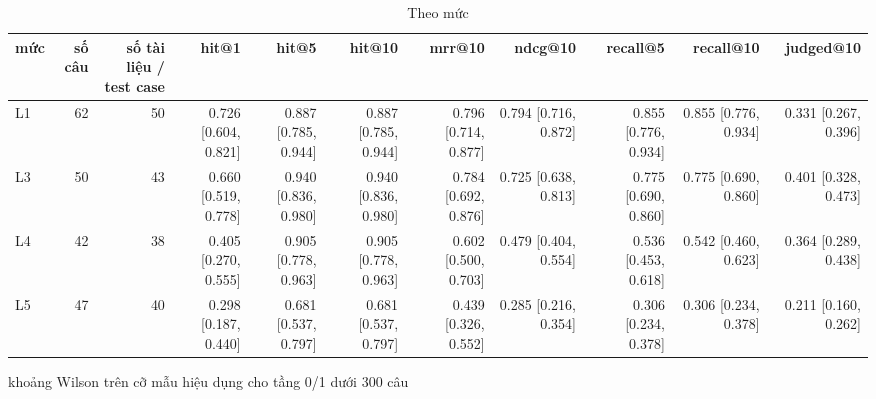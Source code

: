 \begin{table}[ht]
\centering
\caption{Theo mức}
\begin{tabular}{lrrrrrrrrrr}
\toprule
mức & số câu & số tài liệu / test case & hit@1 & hit@5 & hit@10 & mrr@10 & ndcg@10 & recall@5 & recall@10 & judged@10 \\
\midrule
L1 & 62 & 50 & 0.726 [0.604, 0.821] & 0.887 [0.785, 0.944] & 0.887 [0.785, 0.944] & 0.796 [0.714, 0.877] & 0.794 [0.716, 0.872] & 0.855 [0.776, 0.934] & 0.855 [0.776, 0.934] & 0.331 [0.267, 0.396] \\
L3 & 50 & 43 & 0.660 [0.519, 0.778] & 0.940 [0.836, 0.980] & 0.940 [0.836, 0.980] & 0.784 [0.692, 0.876] & 0.725 [0.638, 0.813] & 0.775 [0.690, 0.860] & 0.775 [0.690, 0.860] & 0.401 [0.328, 0.473] \\
L4 & 42 & 38 & 0.405 [0.270, 0.555] & 0.905 [0.778, 0.963] & 0.905 [0.778, 0.963] & 0.602 [0.500, 0.703] & 0.479 [0.404, 0.554] & 0.536 [0.453, 0.618] & 0.542 [0.460, 0.623] & 0.364 [0.289, 0.438] \\
L5 & 47 & 40 & 0.298 [0.187, 0.440] & 0.681 [0.537, 0.797] & 0.681 [0.537, 0.797] & 0.439 [0.326, 0.552] & 0.285 [0.216, 0.354] & 0.306 [0.234, 0.378] & 0.306 [0.234, 0.378] & 0.211 [0.160, 0.262] \\
\bottomrule
\end{tabular}
\par\smallskip\footnotesize khoảng Wilson trên cỡ mẫu hiệu dụng cho tầng 0/1 dưới 300 câu
\end{table}

